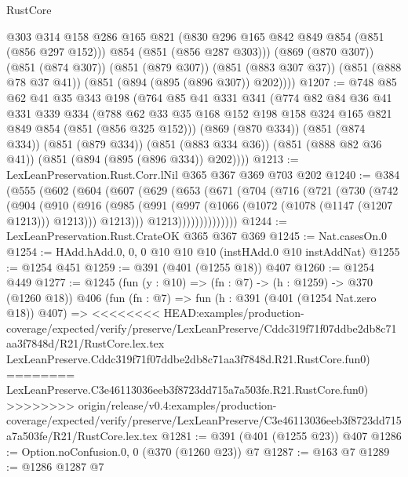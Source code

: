 \begin{lexlean}{RustCore}
\begin{coremodule}
{\begin{coremodule}
{{{{{          @303
          @314
          @158
          @286
          @165
          @821
          (@830 @296 @165 @842 @849 @854 (@851 (@856 @297 @152)))
          @854
          (@851 (@856 @287 @303)))
        (@869 (@870 @307))
        (@851 (@874 @307))
        (@851 (@879 @307))
        (@851 (@883 @307 @37))
        (@851 (@888 @78 @37 @41))
        (@851 (@894 (@895 (@896 @307)) @202))))
@1207 := @748
    @85
    @62
    @41
    @35
    @343
    @198
    (@764
      @85
      @41
      @331
      @341
      (@774
        @82
        @84
        @36
        @41
        @331
        @339
        @334
        (@788 @62 @33 @35 @168 @152 @198 @158 @324 @165 @821 @849 @854 (@851 (@856 @325 @152)))
        (@869 (@870 @334))
        (@851 (@874 @334))
        (@851 (@879 @334))
        (@851 (@883 @334 @36))
        (@851 (@888 @82 @36 @41))
        (@851 (@894 (@895 (@896 @334)) @202))))
@1213 := LexLeanPreservation.Rust.Corr.lNil @365 @367 @369 @703 @202
@1240 := @384
    (@555
      (@602
        (@604
          (@607
            (@629
              (@653
                (@671
                  (@704
                    (@716
                      (@721
                        (@730
                          (@742
                            (@904
                              (@910
                                (@916
                                  (@985
                                    (@991
                                      (@997 (@1066 (@1072 (@1078 (@1147 (@1207 @1213))) @1213)))
                                      @1213)))
                                @1213))))))))))))))
@1244 := LexLeanPreservation.Rust.CrateOK @365 @367 @369
@1245 := Nat.casesOn.{0}
@1254 := HAdd.hAdd.{0, 0, 0} @10 @10 @10 (instHAdd.{0} @10 instAddNat)
@1255 := @1254 @451
@1259 := @391 (@401 (@1255 @18)) @407
@1260 := @1254 @449
@1277 := @1245
    (fun (y : @10) => (fn : @7) -> (h : @1259) -> @370 (@1260 @18))
    @406
    (fun (fn : @7) =>
    fun (h : @391 (@401 (@1254 Nat.zero @18)) @407) =>
<<<<<<<< HEAD:examples/production-coverage/expected/verify/preserve/LexLeanPreserve/Cddc319f71f07ddbe2db8c71aa3f7848d/R21/RustCore.lex.tex
    LexLeanPreserve.Cddc319f71f07ddbe2db8c71aa3f7848d.R21.RustCore.fun0)
========
    LexLeanPreserve.C3e46113036eeb3f8723dd715a7a503fe.R21.RustCore.fun0)
>>>>>>>> origin/release/v0.4:examples/production-coverage/expected/verify/preserve/LexLeanPreserve/C3e46113036eeb3f8723dd715a7a503fe/R21/RustCore.lex.tex
@1281 := @391 (@401 (@1255 @23)) @407
@1286 := Option.noConfusion.{0, 0} (@370 (@1260 @23)) @7
@1287 := @163 @7
@1289 := @1286 @1287 @7
}}}}}
\end{coremodule}}
\end{coremodule}
\end{lexlean}
